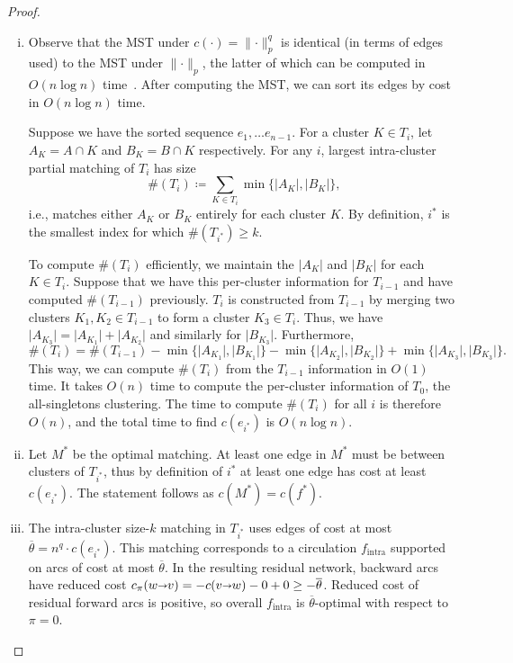 \documentclass[11pt]{article}
\def\set#1{\{ #1 \}}
\def\abs#1{\mathopen| #1 \mathclose|}		%
\def\norm#1{\mathopen\| #1 \mathclose\|}	%
\def\arcto{\mathord\shortrightarrow}
\def\arc#1#2{#1\arcto#2}
\numberwithin{figure}{section}
\begin{document}
\begin{proof}
\begin{enumerate}[(i)]
\item Observe that the MST under $c(\cdot) = \norm{\cdot}_p^q$ is identical
	(in terms of edges used) to the MST under $\norm{\cdot}_p$, the latter
	of which can be computed in $O(n\log n)$ time~\cite{CD85}.
	After computing the MST, we can sort its edges by cost in $O(n\log n)$ time.

	Suppose we have the sorted sequence $e_1, \ldots e_{n-1}$.
	For a cluster $K \in T_i$, let $A_K = A \cap K$ and $B_K = B \cap K$ respectively.
	For any $i$, largest intra-cluster partial matching of $T_i$ has size
	\[
	\#(T_i) \coloneqq \sum_{K \in T_i} \min\set{\abs{A_K}, \abs{B_K}},
	\]
	i.e., matches either $A_K$ or $B_K$ entirely for each cluster $K$.
	By definition, $i^*$ is the smallest index for which $\#(T_{i^*}) \geq k$.

	To compute $\#(T_i)$ efficiently, we maintain the $\abs{A_K}$ and
	$\abs{B_K}$ for each $K \in T_i$.
	Suppose that we have this per-cluster information for $T_{i-1}$ and
	have computed $\#(T_{i-1})$ previously.
	$T_i$ is constructed from $T_{i-1}$ by merging two clusters
	$K_1, K_2 \in T_{i-1}$ to form a cluster $K_3 \in T_i$.
	Thus, we have $\abs{A_{K_3}} = \abs{A_{K_1}} + \abs{A_{K_2}}$ and
	similarly for $\abs{B_{K_3}}$.
	Furthermore,
	\[
	\#(T_i) = \#(T_{i-1}) - \min\set{\abs{A_{K_1}}, \abs{B_{K_1}}} - \min\set{\abs{A_{K_2}}, \abs{B_{K_2}}} + \min\set{\abs{A_{K_3}}, \abs{B_{K_3}}}.
	\]
	This way, we can compute $\#(T_i)$ from the $T_{i-1}$ information in $O(1)$ time.
	It takes $O(n)$ time to compute the per-cluster information of $T_0$, the all-singletons clustering.
	The time to compute $\#(T_i)$ for all $i$ is therefore $O(n)$,
	and the total time to find $c(e_{i^*})$ is $O(n\log n)$.
\item Let $M^*$ be the optimal matching.
	At least one edge in $M^*$ must be between clusters of $T_{i^*}$,
	thus by definition of $i^*$ at least one edge has cost at least $c(e_{i^*})$.
	The statement follows as $c(M^*) = c(f^*)$.
\item The intra-cluster size-$k$ matching in $T_{i^*}$ uses edges of cost at most
	$\overline{\theta} = n^q \cdot c(e_{i^*})$.
	This matching corresponds to a circulation $f_\text{intra}$ supported
	on arcs of cost at most $\overline{\theta}$.
	In the resulting residual network, backward arcs have reduced cost
	$c_\pi(\arc wv) = -c(\arc vw) - 0 + 0 \geq -\overline{\theta}$.
	Reduced cost of residual forward arcs is positive, so overall
	$f_\text{intra}$ is $\overline{\theta}$-optimal with respect to $\pi = 0$.
\end{enumerate}
\end{proof}
\end{document}
